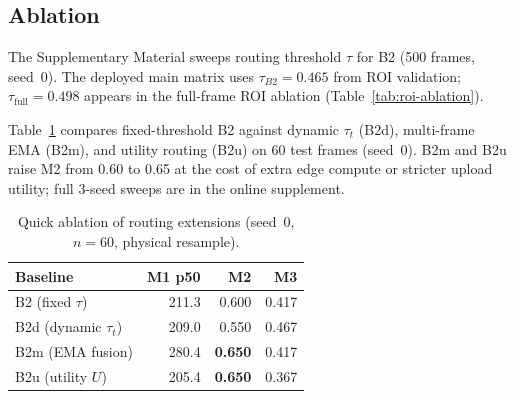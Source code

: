\subsection{Ablation}
\label{sec:ablation}

The Supplementary Material sweeps routing threshold $\tau$ for B2 (500 frames, seed~0).
The deployed main matrix uses $\tau_{B2}{=}0.465$ from ROI validation; $\tau_{\mathrm{full}}{=}0.498$ appears in the full-frame ROI ablation (Table~\ref{tab:roi-ablation}).

Table~\ref{tab:algo-ablation} compares fixed-threshold B2 against dynamic $\tau_t$ (B2d), multi-frame EMA (B2m), and utility routing (B2u) on 60 test frames (seed~0).
B2m and B2u raise M2 from 0.60 to 0.65 at the cost of extra edge compute or stricter upload utility; full 3-seed sweeps are in the online supplement.

\begin{table}[!t]
\centering
\caption{Quick ablation of routing extensions (seed~0, $n{=}60$, physical resample).}
\label{tab:algo-ablation}
\small
\setlength{\tabcolsep}{4pt}
\begin{tabular}{lrrr}
\hline
Baseline & M1 p50 & M2 & M3 \\
\hline
B2 (fixed $\tau$) & 211.3 & 0.600 & 0.417 \\
B2d (dynamic $\tau_t$) & 209.0 & 0.550 & 0.467 \\
B2m (EMA fusion) & 280.4 & \textbf{0.650} & 0.417 \\
B2u (utility $U$) & 205.4 & \textbf{0.650} & 0.367 \\
\hline
\end{tabular}
\end{table}
